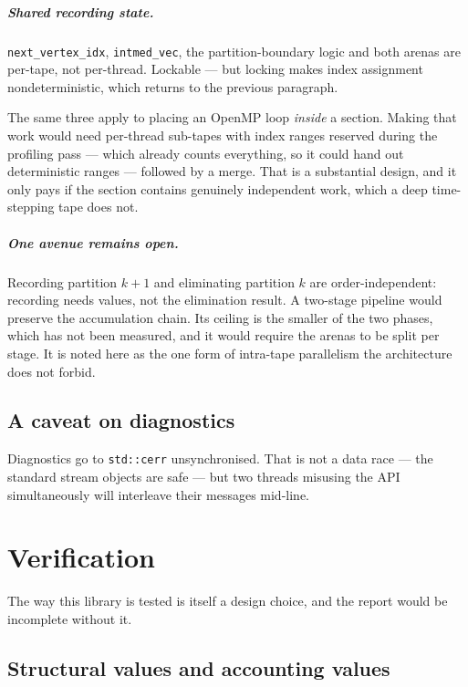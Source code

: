 \documentclass[11pt,a4paper]{report}
\newcommand{\code}[1]{\texttt{#1}}
\begin{document}
\paragraph{Shared recording state.} \code{next\_vertex\_idx},
\code{intmed\_vec}, the partition-boundary logic and both arenas are per-tape,
not per-thread. Lockable --- but locking makes index assignment
nondeterministic, which returns to the previous paragraph.

The same three apply to placing an OpenMP loop \emph{inside} a section. Making
that work would need per-thread sub-tapes with index ranges reserved during the
profiling pass --- which already counts everything, so it could hand out
deterministic ranges --- followed by a merge. That is a substantial design, and
it only pays if the section contains genuinely independent work, which a deep
time-stepping tape does not.

\paragraph{One avenue remains open.} Recording partition $k+1$ and eliminating
partition $k$ are order-independent: recording needs values, not the elimination
result. A two-stage pipeline would preserve the accumulation chain. Its ceiling
is the smaller of the two phases, which has not been measured, and it would
require the arenas to be split per stage. It is noted here as the one form of
intra-tape parallelism the architecture does not forbid.

\section{A caveat on diagnostics}

Diagnostics go to \code{std::cerr} unsynchronised. That is not a data race ---
the standard stream objects are safe --- but two threads misusing the API
simultaneously will interleave their messages mid-line.

\chapter{Verification}
\label{ch:verify}

The way this library is tested is itself a design choice, and the report would
be incomplete without it.

\section{Structural values and accounting values}
\end{document}
